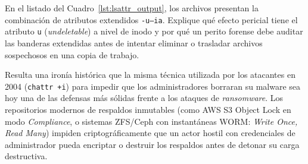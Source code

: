 \begin{retoforense}
En el listado del Cuadro~\ref{lst:lsattr_output}, los archivos presentan la combinación de atributos extendidos \texttt{-u--ia}. Explique qué efecto pericial tiene el atributo \texttt{u} (\textit{undeletable}) a nivel de inodo y por qué un perito forense debe auditar las banderas extendidas antes de intentar eliminar o trasladar archivos sospechosos en una copia de trabajo.
\end{retoforense}

\begin{perspectiva20}
Resulta una ironía histórica que la misma técnica utilizada por los atacantes en 2004 (\texttt{chattr +i}) para impedir que los administradores borraran su malware sea hoy una de las defensas más sólidas frente a los ataques de \textit{ransomware}. Los repositorios modernos de respaldos inmutables (como AWS S3 Object Lock en modo \textit{Compliance}, o sistemas ZFS/Ceph con instantáneas WORM: \textit{Write Once, Read Many}) impiden criptográficamente que un actor hostil con credenciales de administrador pueda encriptar o destruir los respaldos antes de detonar su carga destructiva.
\end{perspectiva20}
